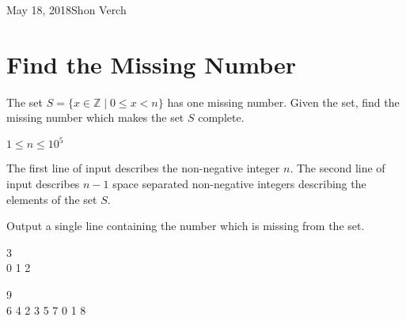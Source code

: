 

             {May 18, 2018}{Shon Verch}



\makeHeader

\section{Find the Missing Number}
The set $S = \{x \in \mathbb{Z} \mid 0 \le x < n\}$ has one missing number. Given the set, find the missing number which makes the set $S$ complete.

\constraints
$1 \leq n \leq 10^5$

The first line of input describes the non-negative integer $n$. The second line of input describes $n-1$ space separated non-negative integers describing the elements of the set $S$.

\outputformat
Output a single line containing the number which is missing from the set.

\vspace{1em}

\addsample
{
3\\
0 1
}
{
2
}

\pushnewpage

\addsample
{
9\\
6 4 2 3 5 7 0 1
}
{
8
}

